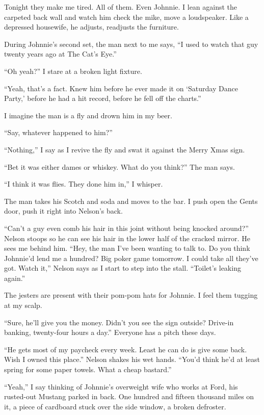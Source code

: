 \documentclass[
]{article}
\begin{document}
Tonight they make me tired. All of them. Even Johnnie. I lean against
the carpeted back wall and watch him check the mike, move a loudspeaker.
Like a depressed housewife, he adjusts, readjusts the furniture.

During Johnnie's second set, the man next to me says, ``I used to watch
that guy twenty years ago at The Cat's Eye.''

``Oh yeah?'' I stare at a broken light fixture.

``Yeah, that's a fact. Knew him before he ever made it on `Saturday
Dance Party,' before he had a hit record, before he fell off the
charts.''

I imagine the man is a fly and drown him in my beer.

``Say, whatever happened to him?''

``Nothing,'' I say as I revive the fly and swat it against the Merry
Xmas sign.

``Bet it was either dames or whiskey. What do you think?'' The man says.

``I think it was flies. They done him in,'' I whisper.

The man takes his Scotch and soda and moves to the bar. I push open the
Gents door, push it right into Nelson's back.

``Can't a guy even comb his hair in this joint without being knocked
around?'' Nelson stoops so he can see his hair in the lower half of the
cracked mirror. He sees me behind him. ``Hey, the man I've been wanting
to talk to. Do you think Johnnie'd lend me a hundred? Big poker game
tomorrow. I could take all they've got. Watch it,'' Nelson says as I
start to step into the stall. ``Toilet's leaking again.''

The jesters are present with their pom-pom hats for Johnnie. I feel them
tugging at my scalp.

``Sure, he'll give you the money. Didn't you see the sign outside?
Drive-in banking, twenty-four hours a day.'' Everyone has a pitch these
days.

``He gets most of my paycheck every week. Least he can do is give some
back. Wish I owned this place.'' Nelson shakes his wet hands. ``You'd
think he'd at least spring for some paper towels. What a cheap
bastard.''

``Yeah,'' I say thinking of Johnnie's overweight wife who works at Ford,
his rusted-out Mustang parked in back. One hundred and fifteen thousand
miles on it, a piece of cardboard stuck over the side window, a broken
defroster.
\end{document}
